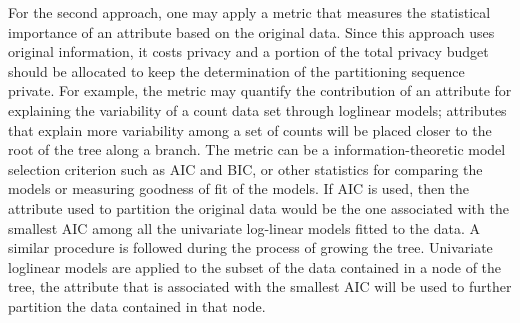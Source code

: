 \documentclass[12pt, A4]{article}
\theoremstyle{plain}
\theoremstyle{exampstyle}\newtheorem{defn}{Definition}
\theoremstyle{exampstyle}\newtheorem{lem}{Lemma}
\theoremstyle{exampstyle}\newtheorem{cor}{Corollary}
\theoremstyle{exampstyle}\newtheorem{pro}{Proposition}
\theoremstyle{exampstyle}\newtheorem{cla}{Claim}
\theoremstyle{exampstyle}\newtheorem{rem}{Remark}
\begin{document}
For the second approach, one may apply a metric that measures the statistical importance of an attribute based on the original data. Since this approach uses original information, it costs privacy and a portion of the total privacy budget should be allocated to keep the determination of the partitioning sequence private. For example, the metric may quantify the contribution of an attribute for explaining the variability of a count data set through loglinear models; attributes that explain more variability among a set of counts will be placed closer to the root of the tree along a branch. The metric can be a information-theoretic model selection criterion such as AIC and BIC, or other statistics for comparing the models or measuring goodness of fit of the models. If AIC is used, then the attribute used to partition the original data would be the one associated with the smallest AIC among all the univariate log-linear models fitted to the data. A similar procedure is followed during the process of growing the tree. Univariate loglinear models are applied to the subset of the data contained in a node of the tree, the attribute that is associated with the smallest AIC will be used to further partition the data contained in that node.
\end{document}
